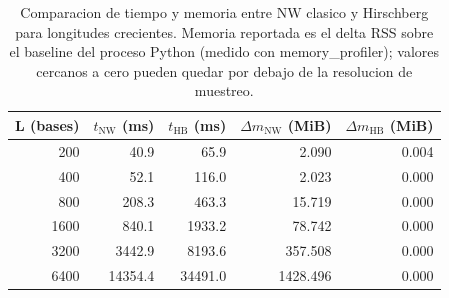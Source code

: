 \begin{table}[h]
\centering
\small
\caption{Comparacion de tiempo y memoria entre NW clasico y Hirschberg para longitudes crecientes. Memoria reportada es el delta RSS sobre el baseline del proceso Python (medido con memory\_profiler); valores cercanos a cero pueden quedar por debajo de la resolucion de muestreo.}
\begin{tabular}{rrrrr}
\toprule
L (bases) & $t_{\text{NW}}$ (ms) & $t_{\text{HB}}$ (ms) & $\Delta m_{\text{NW}}$ (MiB) & $\Delta m_{\text{HB}}$ (MiB) \\
\midrule
200 & 40.9 & 65.9 & 2.090 & 0.004 \\
400 & 52.1 & 116.0 & 2.023 & 0.000 \\
800 & 208.3 & 463.3 & 15.719 & 0.000 \\
1600 & 840.1 & 1933.2 & 78.742 & 0.000 \\
3200 & 3442.9 & 8193.6 & 357.508 & 0.000 \\
6400 & 14354.4 & 34491.0 & 1428.496 & 0.000 \\
\bottomrule
\end{tabular}
\end{table}
